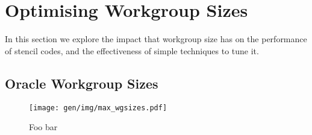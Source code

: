 

\section{Optimising Workgroup Sizes}

In this section we explore the impact that workgroup size has on the
performance of stencil codes, and the effectiveness of simple
techniques to tune it.

\subsection{Oracle Workgroup Sizes}


\begin{figure}
\centering
\texttt{[image: gen/img/max\_wgsizes.pdf]}
\vspace{-1.5em} %
\caption{Foo bar}
\label{fig:max-wgsizes}
\end{figure}


